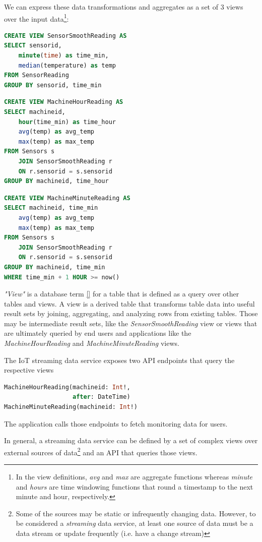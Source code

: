 \documentclass[	DIV=calc,%
							paper=letter,%
							fontsize=11pt,%
							twocolumn]{scrartcl}	 					%
\begin{document}
We can express these data transformations and aggregates as a set of 3 views over the input data\footnote{In the view definitions, \emph{avg} and \emph{max} are aggregate functions whereas \emph{minute} and \emph{hours} are time windowing functions that round a timestamp to the next minute and hour, respectively.}:

\begin{lstlisting}[language=SQL]
CREATE VIEW SensorSmoothReading AS
SELECT sensorid,
    minute(time) as time_min,
    median(temperature) as temp
FROM SensorReading
GROUP BY sensorid, time_min
\end{lstlisting}

\begin{lstlisting}[language=SQL]
CREATE VIEW MachineHourReading AS
SELECT machineid,
    hour(time_min) as time_hour
    avg(temp) as avg_temp
    max(temp) as max_temp
FROM Sensors s
    JOIN SensorSmoothReading r
    ON r.sensorid = s.sensorid
GROUP BY machineid, time_hour
\end{lstlisting}

\begin{lstlisting}[language=SQL]
CREATE VIEW MachineMinuteReading AS
SELECT machineid, time_min
    avg(temp) as avg_temp
    max(temp) as max_temp
FROM Sensors s
    JOIN SensorSmoothReading r
    ON r.sensorid = s.sensorid
GROUP BY machineid, time_min
WHERE time_min + 1 HOUR >= now()
\end{lstlisting}

\emph{"View"} is a database term \ref{} for a table that is defined as a query over other tables and views. A view is a derived table that transforms table data into useful result sets by joining, aggregating, and analyzing rows from existing tables. Those may be intermediate result sets, like the \emph{SensorSmoothReading} view or views that are ultimately queried by end users and applications like the \emph{MachineHourReading} and \emph{MachineMinuteReading} views.

The IoT streaming data service exposes two API endpoints that query the respective views
\begin{lstlisting}[language=SQL]
MachineHourReading(machineid: Int!,
                   after: DateTime)
MachineMinuteReading(machineid: Int!)
\end{lstlisting}
The application calls those endpoints to fetch monitoring data for users.

In general, a streaming data service can be defined by a set of complex views over external sources of data\footnote{Some of the sources may be static or infrequently changing data. However, to be considered a \emph{streaming} data service, at least one source of data must be a data stream or update frequently (i.e. have a change stream)} and an API that queries those views.
\end{document}

